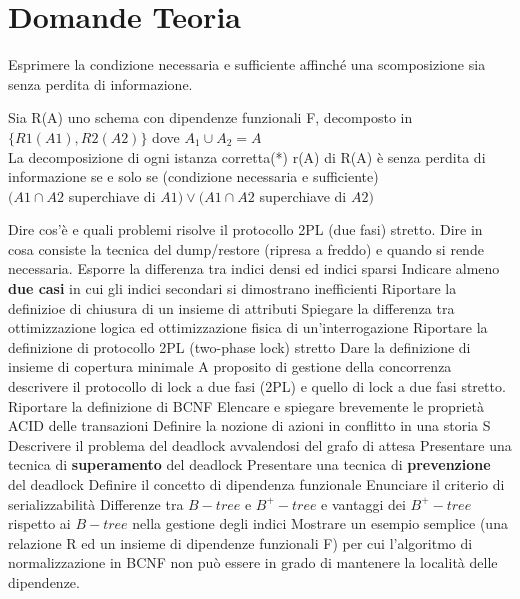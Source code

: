 \documentclass{exam}
\begin{document}
\printanswers

\section{Domande Teoria}

\begin{questions}
    \question Esprimere la condizione necessaria e sufficiente affinché una scomposizione sia senza perdita di informazione.
    \begin{solution}
    Sia R(A) uno schema con dipendenze funzionali F, decomposto in $\{R1(A1), R2(A2)\}$ dove $A_1 \cup A_2 = A$ \\
    La decomposizione di ogni istanza corretta(*) r(A) di  R(A) è senza perdita di informazione se e solo se  (condizione necessaria e sufficiente) \\  
    $(A1\cap A2$ superchiave di $A1)\vee(A1 \cap A2 $ superchiave di $A2) $
    \end{solution}
    \question Dire cos’è e quali problemi risolve il protocollo 2PL (due fasi) stretto.
    \question Dire in cosa consiste la tecnica del dump/restore (ripresa a freddo) e quando si rende necessaria.
    \question Esporre la differenza tra indici densi ed indici sparsi
    \question Indicare almeno \textbf{due casi} in cui gli indici secondari si dimostrano inefficienti
    \question Riportare la definizioe di chiusura di un insieme di attributi
    \question Spiegare la differenza tra ottimizzazione logica ed ottimizzazione fisica di un'interrogazione
    \question Riportare la definizione di protocollo 2PL (two-phase lock) stretto
    \question Dare la definizione di insieme di copertura minimale
    \question A proposito di gestione della concorrenza descrivere il protocollo di lock a due fasi (2PL) e quello di lock a due fasi stretto.
    \question Riportare la definizione di BCNF
    \question Elencare e spiegare brevemente le proprietà ACID delle transazioni
    \question Definire la nozione di azioni in conflitto in una storia S
    \question Descrivere il problema del deadlock avvalendosi del grafo di attesa
    \question Presentare una tecnica di \textbf{superamento} del deadlock
    \question Presentare una tecnica di \textbf{prevenzione} del deadlock
    \question Definire il concetto di dipendenza funzionale
    \question Enunciare il criterio di serializzabilità
    \question Differenze tra $B-tree$ e $B^{+}-tree$ e vantaggi dei $B^{+}-tree$ rispetto ai $B-tree$ nella gestione degli indici
    \question Mostrare un esempio semplice (una relazione R ed un insieme di dipendenze funzionali F) per cui  l’algoritmo di normalizzazione in BCNF non può essere in grado di mantenere la località delle dipendenze. 

\end{questions}
\end{document}
